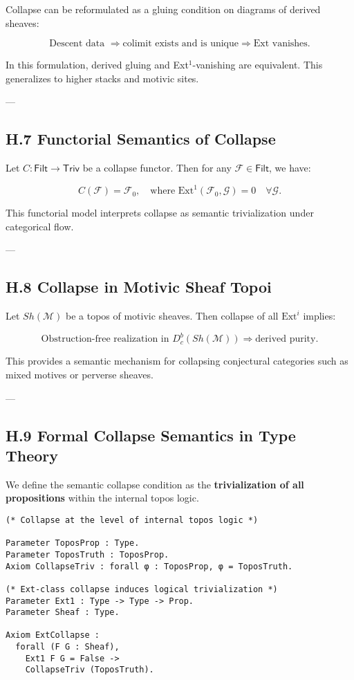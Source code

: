 \documentclass[11pt]{article}
\begin{document}
Collapse can be reformulated as a gluing condition on diagrams of derived sheaves:

\[
\text{Descent data } \Rightarrow \text{colimit exists and is unique} \Rightarrow \text{Ext vanishes}.
\]

In this formulation, derived gluing and Ext$^1$-vanishing are equivalent.  
This generalizes to higher stacks and motivic sites.

---

\subsection*{H.7 Functorial Semantics of Collapse}

Let $C: \mathsf{Filt} \to \mathsf{Triv}$ be a collapse functor.  
Then for any $\mathcal{F} \in \mathsf{Filt}$, we have:

\[
C(\mathcal{F}) = \mathcal{F}_0, \quad \text{where } \mathrm{Ext}^1(\mathcal{F}_0, \mathcal{G}) = 0 \quad \forall \mathcal{G}.
\]

This functorial model interprets collapse as semantic trivialization under categorical flow.

---

\subsection*{H.8 Collapse in Motivic Sheaf Topoi}

Let $Sh(\mathcal{M})$ be a topos of motivic sheaves.  
Then collapse of all $\mathrm{Ext}^i$ implies:

\[
\text{Obstruction-free realization in } D^b_c(Sh(\mathcal{M})) \Rightarrow \text{derived purity}.
\]

This provides a semantic mechanism for collapsing conjectural categories such as mixed motives or perverse sheaves.

---

\subsection*{H.9 Formal Collapse Semantics in Type Theory}

We define the semantic collapse condition as the \textbf{trivialization of all propositions} within the internal topos logic.

\begin{lstlisting}[language=Coq, caption=Topos-Level Collapse Trivialization]
(* Collapse at the level of internal topos logic *)

Parameter ToposProp : Type.
Parameter ToposTruth : ToposProp.
Axiom CollapseTriv : forall φ : ToposProp, φ = ToposTruth.

(* Ext-class collapse induces logical trivialization *)
Parameter Ext1 : Type -> Type -> Prop.
Parameter Sheaf : Type.

Axiom ExtCollapse :
  forall (F G : Sheaf),
    Ext1 F G = False ->
    CollapseTriv (ToposTruth).
\end{lstlisting}
\end{document}
